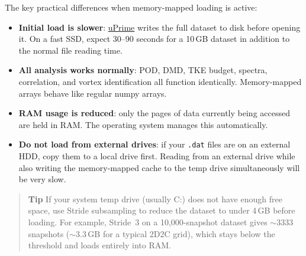 The key practical differences when memory-mapped loading is active:

\begin{itemize}[leftmargin=1.5em]
  \item \textbf{Initial load is slower}: \href{https://cmdrryder.github.io/uPrime/}{uPrime} writes the full dataset to disk before opening it. On a fast SSD, expect 30--90 seconds for a 10\,GB dataset in addition to the normal file reading time.
  \item \textbf{All analysis works normally}: POD, DMD, TKE budget, spectra, correlation, and vortex identification all function identically. Memory-mapped arrays behave like regular numpy arrays.
  \item \textbf{RAM usage is reduced}: only the pages of data currently being accessed are held in RAM. The operating system manages this automatically.
  \item \textbf{Do not load from external drives}: if your \texttt{.dat} files are on an external HDD, copy them to a local drive first. Reading from an external drive while also writing the memory-mapped cache to the temp drive simultaneously will be very slow.
\end{itemize}

\begin{quote}
\textbf{Tip}
If your system temp drive (usually C:) does not have enough free space, use Stride subsampling to reduce the dataset to under 4\,GB before loading. For example, Stride~3 on a 10,000-snapshot dataset gives $\sim$3333 snapshots ($\sim$3.3\,GB for a typical 2D2C grid), which stays below the threshold and loads entirely into RAM.
\end{quote}

